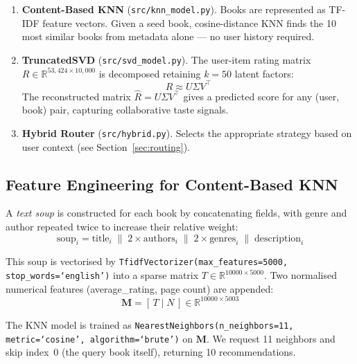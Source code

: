 \documentclass[12pt, a4paper]{article}
\begin{document}
\begin{enumerate}
  \item \textbf{Content-Based KNN} (\texttt{src/knn\_model.py}).
        Books are represented as TF-IDF feature vectors.
        Given a seed book, cosine-distance KNN finds the 10 most similar books
        from metadata alone --- no user history required.

  \item \textbf{TruncatedSVD} (\texttt{src/svd\_model.py}).
        The user-item rating matrix $R \in \mathbb{R}^{53{,}424 \times 10{,}000}$
        is decomposed retaining $k=50$ latent factors:
        \[
          R \approx U \Sigma V^\top
        \]
        The reconstructed matrix $\hat{R} = U \Sigma V^\top$ gives a predicted score
        for any (user, book) pair, capturing collaborative taste signals.

  \item \textbf{Hybrid Router} (\texttt{src/hybrid.py}).
        Selects the appropriate strategy based on user context (see Section~\ref{sec:routing}).
\end{enumerate}

\subsection{Feature Engineering for Content-Based KNN}

A \textit{text soup} is constructed for each book by concatenating fields,
with genre and author repeated twice to increase their relative weight:
\[
  \text{soup}_i = \text{title}_i \;\|\;
                  2\times\text{authors}_i \;\|\;
                  2\times\text{genres}_i \;\|\;
                  \text{description}_i
\]

This soup is vectorised by \texttt{TfidfVectorizer(max\_features=5000, stop\_words=`english')}
into a sparse matrix $T \in \mathbb{R}^{10000 \times 5000}$.
Two normalised numerical features (average\_rating, page count) are appended:
\[
  \mathbf{M} = [\,T \;|\; N\,] \in \mathbb{R}^{10000 \times 5003}
\]

The KNN model is trained as
\texttt{NearestNeighbors(n\_neighbors=11, metric=`cosine', algorithm=`brute')} on $\mathbf{M}$.
We request 11 neighbors and skip index~0 (the query book itself), returning 10 recommendations.
\end{document}
